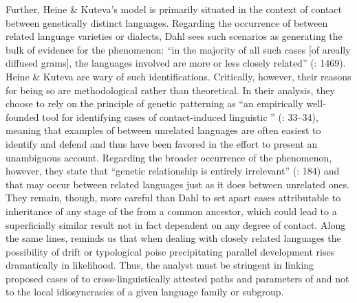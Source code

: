 \documentclass[output=paper]{langsci/langscibook}
\begin{document}
Further, Heine \& Kuteva’s model is primarily situated in the context of contact between genetically distinct languages. Regarding the occurrence of  between related language varieties or dialects, Dahl sees such scenarios as generating the bulk of evidence for the phenomenon: “in the majority of all such cases [of areally diffused grams], the languages involved are more or less closely related” (\citeyear{Dahl2001}: 1469). Heine \& Kuteva are wary of such identifications. Critically, however, their reasons for being so are methodological rather than theoretical. In their analysis, they choose to rely on the principle of genetic patterning as “an empirically well-founded tool for identifying cases of contact-induced linguistic ” (\citeyear{HeineKuteva2005}: 33--34), meaning that examples of  between unrelated languages are often easiest to identify and defend and thus have been favored in the effort to present an unambiguous account. Regarding the broader occurrence of the phenomenon, however, they state that “genetic relationship is entirely irrelevant” (\citeyear{HeineKuteva2005}: 184) and that  may occur between related languages just as it does between unrelated ones. They remain, though, more careful than Dahl to set apart cases attributable to inheritance of any stage of the  from a common ancestor, which could lead to a superficially similar result not in fact dependent on any degree of contact. Along the same lines, \citet{Law2014} reminds us that when dealing with closely related languages the possibility of drift or typological poise precipitating parallel development rises dramatically in likelihood. Thus, the analyst must be stringent in linking proposed cases of  to cross-linguistically attested paths and parameters of  and not to the local idiosyncrasies of a given language family or subgroup.
\end{document}
